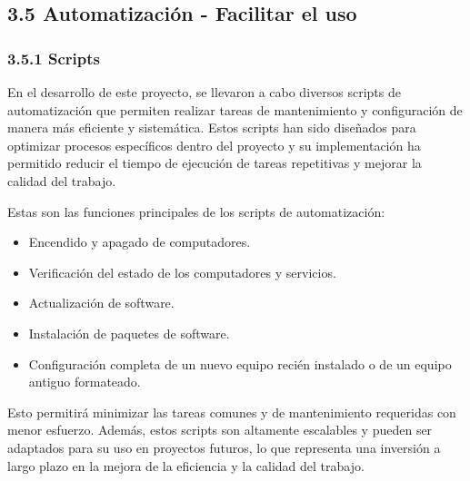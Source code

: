 \begin{doublespace}
    \subsection{3.5 Automatización - Facilitar el uso}

    \subsubsection{3.5.1 Scripts}

    En el desarrollo de este proyecto, se llevaron a cabo diversos scripts de automatización que permiten realizar tareas de mantenimiento y configuración de manera más eficiente y sistemática. Estos scripts han sido diseñados para optimizar procesos específicos dentro del proyecto y su implementación ha permitido reducir el tiempo de ejecución de tareas repetitivas y mejorar la calidad del trabajo.

    Estas son las funciones principales de los scripts de automatización:

    \begin{itemize}
        \item Encendido y apagado de computadores.
        \item Verificación del estado de los computadores y servicios.
        \item Actualización de software.
        \item Instalación de paquetes de software.
        \item Configuración completa de un nuevo equipo recién instalado o de un equipo antiguo formateado.
    \end{itemize}
   
    Esto permitirá minimizar las tareas comunes y de mantenimiento requeridas con menor esfuerzo. Además, estos scripts son altamente escalables y pueden ser adaptados para su uso en proyectos futuros, lo que representa una inversión a largo plazo en la mejora de la eficiencia y la calidad del trabajo.

\mylinespacing
\mylinespacing
\begin{tightcenter}
\end{tightcenter}
\end{doublespace}
